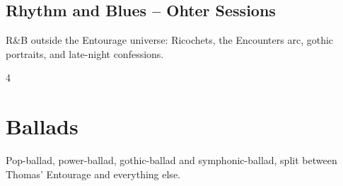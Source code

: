 \documentclass[a4paper,landscape]{memoir}
\begin{document}
\chapter{Rhythm and Blues -- Ohter Sessions}
R\&B outside the Entourage universe: Ricochets, the Encounters arc, gothic portraits, and late-night confessions.
\clearpage\begin{multicols*}{4}
\end{multicols*}

\part{Ballads}
Pop-ballad, power-ballad, gothic-ballad and symphonic-ballad, split between Thomas' Entourage and everything else.
\end{document}
